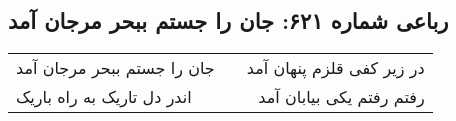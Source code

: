 \begin{center}
\section*{رباعی شماره ۶۲۱: جان را جستم ببحر مرجان آمد}
\label{sec:0621}
\begin{longtable}{l p{0.5cm} r}
جان را جستم ببحر مرجان آمد
&&
در زیر کفی قلزم پنهان آمد
\\
اندر دل تاریک به راه باریک
&&
رفتم رفتم یکی بیابان آمد
\\
\end{longtable}
\end{center}
